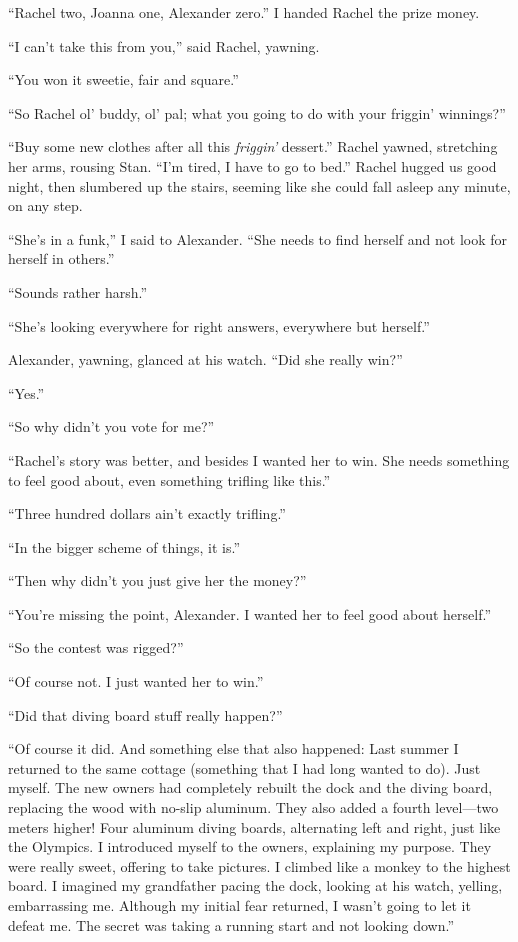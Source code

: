 ``Rachel two, Joanna one, Alexander zero.'' I handed Rachel the prize
money.

``I can't take this from you,'' said Rachel, yawning.

``You won it sweetie, fair and square.''

``So Rachel ol' buddy, ol' pal; what you going to do with your friggin'
winnings?''

``Buy some new clothes after all this \emph{friggin'} dessert.'' Rachel
yawned, stretching her arms, rousing Stan. ``I'm tired, I have to go to
bed.'' Rachel hugged us good night, then slumbered up the stairs,
seeming like she could fall asleep any minute, on any step.

``She's in a funk,'' I said to Alexander. ``She needs to find herself
and not look for herself in others.''

``Sounds rather harsh.''

``She's looking everywhere for right answers, everywhere but herself.''

Alexander, yawning, glanced at his watch. ``Did she really win?''

``Yes.''

``So why didn't you vote for me?''

``Rachel's story was better, and besides I wanted her to win. She needs
something to feel good about, even something trifling like this.''

``Three hundred dollars ain't exactly trifling.''

``In the bigger scheme of things, it is.''

``Then why didn't you just give her the money?''

``You're missing the point, Alexander. I wanted her to feel good about
herself.''

``So the contest was rigged?''

``Of course not. I just wanted her to win.''

``Did that diving board stuff really happen?''

``Of course it did. And something else that also happened: Last summer I
returned to the same cottage (something that I had long wanted to do).
Just myself. The new owners had completely rebuilt the dock and the
diving board, replacing the wood with no-slip aluminum. They also added
a fourth level---two meters higher! Four aluminum diving boards,
alternating left and right, just like the Olympics. I introduced myself
to the owners, explaining my purpose. They were really sweet, offering
to take pictures. I climbed like a monkey to the highest board. I
imagined my grandfather pacing the dock, looking at his watch, yelling,
embarrassing me. Although my initial fear returned, I wasn't going to
let it defeat me. The secret was taking a running start and not looking
down.''

